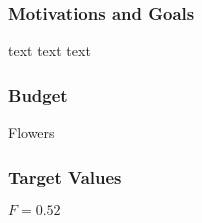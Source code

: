 \documentclass[8pt]{beamer}
\begin{document}
\begin{frame}\frametitle{Motivations and Goals}
text text text

\end{frame}

\begin{frame}\frametitle{Budget}
Flowers
\end{frame}

\begin{frame}\frametitle{Target Values} \label{targets}
$F=0.52$
\end{frame}
\end{document}
